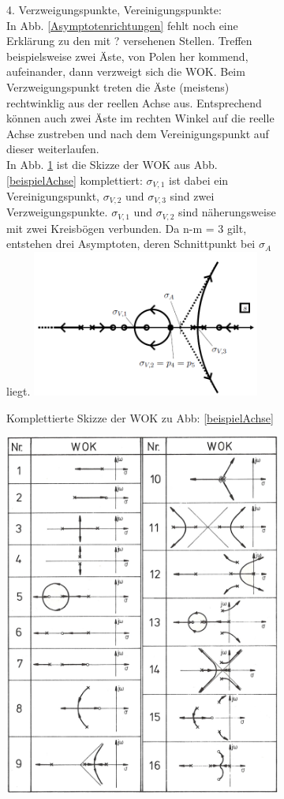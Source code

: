 \begin{enumerate}
\begin{figure}[h!]
	\begin{center}
	\begin{subfigure}[b]{7.5cm}
\item 4. Verzweigungspunkte, Vereinigungspunkte:\\ %
In Abb. \ref{Asymptotenrichtungen} fehlt noch eine Erklärung zu den mit ? versehenen Stellen. Treffen
beispielsweise zwei Äste, von Polen her kommend, aufeinander, dann verzweigt
sich die WOK. Beim Verzweigungspunkt treten die Äste (meistens) rechtwinklig
aus der reellen Achse aus. Entsprechend können auch zwei Äste im rechten
Winkel auf die reelle Achse zustreben und nach dem Vereinigungspunkt auf
dieser weiterlaufen.\\
In Abb. \ref{KomplettWOK} ist die Skizze der WOK aus Abb. \ref{beispielAchse}
komplettiert: $\sigma_{V,1}$ ist dabei ein Vereinigungspunkt, $\sigma_{V,2}$ und $\sigma_{V,3}$ sind zwei
Verzweigungspunkte. $\sigma_{V,1}$ und $\sigma_{V,2}$ sind näherungsweise mit zwei Kreisbögen
verbunden. Da n-m = 3 gilt, entstehen drei Asymptoten, deren Schnittpunkt
bei $\sigma_A$ liegt.
		\includegraphics[width=7.5cm]{./images/KomplettWOK.png}
		\caption{Komplettierte Skizze der WOK zu Abb: \ref{beispielAchse}}
		\label{KomplettWOK}
	\end{subfigure}\qquad
	\begin{subfigure}[b]{10.5cm}
		\centering
		\includegraphics[width=10.5cm]{./images/BilderWOK.png}

\end{subfigure}
\end{center}
\end{figure}
\end{enumerate}
